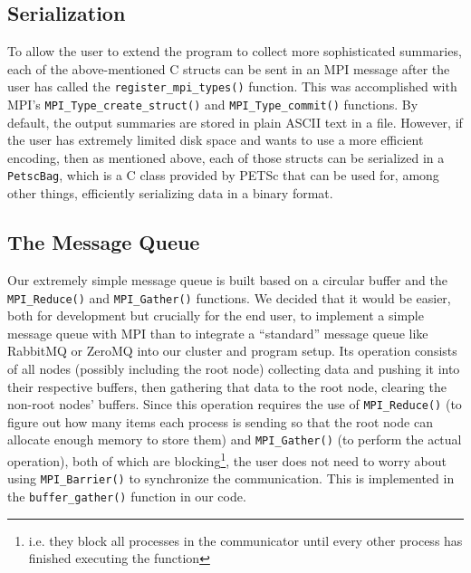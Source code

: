 \documentclass[11pt]{article}
\begin{document}
\subsection*{Serialization}
To allow the user to extend the program to collect more sophisticated summaries, each of the above-mentioned C structs can be sent in an MPI message after the user has called the \lstinline{register_mpi_types()} function. This was accomplished with MPI's \lstinline{MPI_Type_create_struct()} and \lstinline{MPI_Type_commit()} functions. By default, the output summaries are stored in plain ASCII text in a file. However, if the user has extremely limited disk space and wants to use a more efficient encoding, then as mentioned above, each of those structs can be serialized in a \lstinline{PetscBag}, which is a C class provided by PETSc that can be used for, among other things, efficiently serializing data in a binary format.
\subsection*{The Message Queue}
Our extremely simple message queue is built based on a circular buffer and the \lstinline{MPI_Reduce()} and \lstinline{MPI_Gather()} functions. We decided that it would be easier, both for development but crucially for the end user, to implement a simple message queue with MPI than to integrate a ``standard'' message queue like RabbitMQ or ZeroMQ into our cluster and program setup. Its operation consists of all nodes (possibly including the root node) collecting data and pushing it into their respective buffers, then gathering that data to the root node, clearing the non-root nodes' buffers. Since this operation requires the use of \lstinline{MPI_Reduce()} (to figure out how many items each process is sending so that the root node can allocate enough memory to store them) and \lstinline{MPI_Gather()} (to perform the actual operation), both of which are blocking\footnote{i.e. they block all processes in the communicator until every other process has finished executing the function}, the user does not need to worry about using \lstinline{MPI_Barrier()} to synchronize the communication. This is implemented in the \lstinline{buffer_gather()} function in our code.
\end{document}
